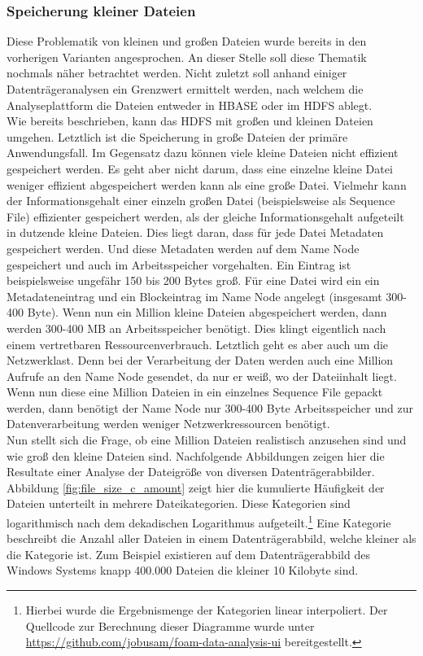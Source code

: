 \subsubsection{Speicherung kleiner Dateien} 
Diese Problematik von kleinen und großen Dateien wurde bereits in den vorherigen Varianten angesprochen. An dieser Stelle soll diese Thematik nochmals näher betrachtet werden. Nicht zuletzt soll anhand einiger Datenträgeranalysen ein Grenzwert ermittelt werden, nach welchem die Analyseplattform die Dateien entweder in HBASE oder im HDFS ablegt.\\

\noindent
Wie bereits beschrieben, kann das HDFS mit großen und kleinen Dateien umgehen. Letztlich ist die Speicherung in große Dateien der primäre Anwendungsfall. Im Gegensatz dazu können viele kleine Dateien nicht effizient gespeichert werden. Es geht aber nicht darum, dass eine einzelne kleine Datei weniger effizient abgespeichert werden kann als eine große Datei. Vielmehr kann der Informationsgehalt einer einzeln großen Datei (beispielsweise als Sequence File) effizienter gespeichert werden, als der gleiche Informationsgehalt aufgeteilt in dutzende kleine Dateien. Dies liegt daran, dass für jede Datei Metadaten gespeichert werden. Und diese Metadaten werden auf dem Name Node gespeichert und auch im Arbeitsspeicher vorgehalten.\cite{hdfs_architecture} Ein Eintrag ist beispielsweise ungefähr 150 bis 200 Bytes groß. Für eine Datei wird ein ein Metadateneintrag und ein Blockeintrag im Name Node angelegt (insgesamt 300-400 Byte). Wenn nun ein Million kleine Dateien abgespeichert werden, dann werden 300-400 MB an Arbeitsspeicher benötigt. Dies klingt eigentlich nach einem vertretbaren Ressourcenverbrauch. Letztlich geht es aber auch um die Netzwerklast. Denn bei der Verarbeitung der Daten werden auch eine Million Aufrufe an den Name Node gesendet, da nur er weiß, wo der Dateiinhalt liegt. Wenn nun diese eine Million Dateien in ein einzelnes Sequence File gepackt werden, dann benötigt der Name Node nur 300-400 Byte Arbeitsspeicher und zur Datenverarbeitung werden weniger Netzwerkressourcen benötigt.\\

\noindent
Nun stellt sich die Frage, ob eine Million Dateien realistisch anzusehen sind und wie groß den kleine Dateien sind. Nachfolgende Abbildungen zeigen hier die Resultate einer Analyse der Dateigröße von diversen Datenträgerabbilder. Abbildung \ref{fig:file_size_c_amount} zeigt hier die kumulierte Häufigkeit der Dateien unterteilt in mehrere Dateikategorien. Diese Kategorien sind logarithmisch nach dem dekadischen Logarithmus aufgeteilt.\footnote{Hierbei wurde die Ergebnismenge der Kategorien linear interpoliert. Der Quellcode zur Berechnung dieser Diagramme wurde unter \url{https://github.com/jobusam/foam-data-analysis-ui} bereitgestellt. } Eine Kategorie beschreibt die Anzahl aller Dateien in einem Datenträgerabbild, welche kleiner als die Kategorie ist. Zum Beispiel existieren auf dem Datenträgerabbild des Windows Systems knapp 400.000 Dateien die kleiner 10 Kilobyte sind.\\
 
